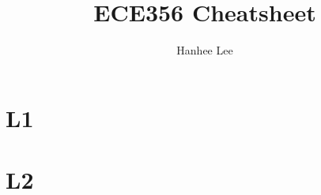 \documentclass[twoside]{article}
\title{ECE356 Cheatsheet}
\author{Hanhee Lee}
\begin{document}
\maketitle

\tableofcontents

\begin{definition}
    
\end{definition}

\begin{process}

\end{process}

\begin{motivation}

\end{motivation}

\begin{derivation}

\end{derivation}

\begin{warning}

\end{warning}

\begin{summary}

\end{summary}

\begin{algo}

\end{algo}

\begin{example}
    
\end{example}

\begin{faq}

\end{faq}

\section{L1}

\cleardoublepage

\section{L2} 

\cleardoublepage
\end{document}
